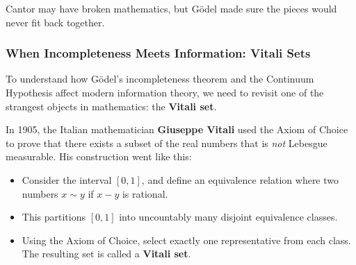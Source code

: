 Cantor may have broken mathematics, but Gödel made sure the pieces would never fit back together. 

\subsubsection{When Incompleteness Meets Information: Vitali Sets}

To understand how Gödel’s incompleteness theorem and the Continuum Hypothesis affect modern information theory, we need to revisit one of the strangest objects in mathematics: the \textbf{Vitali set}.

In 1905, the Italian mathematician \textbf{Giuseppe Vitali} used the Axiom of Choice to prove that there exists a subset of the real numbers that is \emph{not} Lebesgue measurable. His construction went like this:

\begin{itemize}
  \item Consider the interval \([0,1]\), and define an equivalence relation where two numbers \( x \sim y \) if \( x - y \) is rational.
  \item This partitions \([0,1]\) into uncountably many disjoint equivalence classes.
  \item Using the Axiom of Choice, select exactly one representative from each class. The resulting set is called a \textbf{Vitali set}.
\end{itemize}

